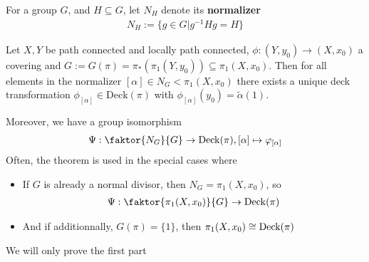 For a group $G$, and $H \subseteq G$, let $N_H$ denote its \textbf{normalizer}
\begin{align*}
  N_H := \{g \in G \big\vert g^{-1}Hg = H\}
\end{align*}
\begin{thm}
  Let $X,Y$ be path connected and locally path connected, $\phi:(Y,y_0) \to (X,x_0)$ a covering and $G := G(\pi) = \pi_{\ast}(\pi_1(Y,y_0)) \subseteq \pi_1(X,x_0)$.
  Then for all elements in the normalizer $[\alpha] \in N_G < \pi_1(X,x_0)$ there exists a unique deck transformation $\phi_{[\alpha]} \in \text{Deck}(\pi)$ with $\phi_{[\alpha]}(y_0) = \tilde{\alpha}(1)$.

  \begin{center}
  \end{center}

  Moreover, we have a group isomorphism
  \begin{align*}
    \Psi: \faktor{N_G}{G} \to  \mathrm{Deck}(\pi), [\alpha] \mapsto  \phi_{[\alpha]} 
  \end{align*}
  Often, the theorem is used in the special cases where
  \begin{itemize}
    \item If $G$ is already a normal divisor, then $N_G = \pi_1(X,x_0)$, so 
      \begin{align*}
        \Psi: \faktor{\pi_1(X,x_0)}{G} \to \mathrm{Deck}(\pi) 
      \end{align*}
    \item And if additionnally, $G(\pi) = \{1\}$, then $\pi_1(X,x_0) \cong \text{Deck}(\pi)$
  \end{itemize}
\end{thm}
We will only prove the first part
